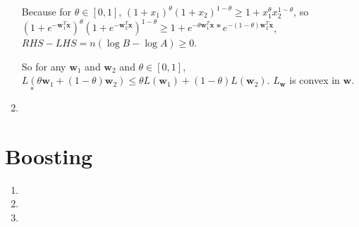 \documentclass[paper=letter, fontsize=12pt]{article}
\begin{document}
\begin{enumerate}[label=(\alph*)]
	Because for $\theta \in [0, 1]$, $(1 + x_1)^\theta (1 + x_2) ^ {1 - \theta} \geq 1 + x_1^{\theta} x_2^{1 - \theta}$, so $(1 + e^{-\mathbf{w}^T_1 \mathbf{x}}) ^ \theta (1 + e^{-\mathbf{w}^T_2 \mathbf{x}}) ^ {1 - \theta} \geq 1 + e^{-\theta \mathbf{w}_1^T \mathbf{x}} * e^{-(1- \theta) \mathbf{w}_2^T \mathbf{x}}$, $RHS - LHS = n(\log{B} - \log{A}) \geq 0$.
	
	So for any $\mathbf{w}_1$ and $\mathbf{w}_2$ and $\theta \in [0, 1]$, $L(\theta \mathbf{w}_1 + (1- \theta) \mathbf{w}_2) \leq \theta L(\mathbf{w}_1) + (1 - \theta) L(\mathbf{w}_2)$. $L_{\mathbf{w}}$ is convex in $\mathbf{w}$. $\ \ \ \ \square$
	
	\item
	
\end{enumerate}

\section{Boosting}

\begin{enumerate}[label=(\alph*)]
	
	\item 
	
	\item 
	
	\item
\end{enumerate}
\end{document}
